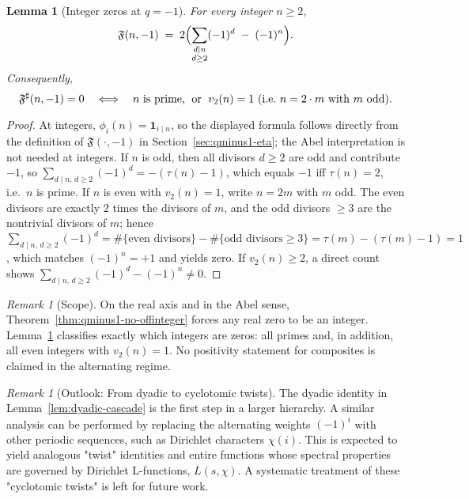 \documentclass[11pt,a4paper]{amsart}
\newcommand{\Fbase}{\mathfrak F}
\newcommand{\Fsharp}{\Fbase^{\sharp}}
\theoremstyle{plain}
\newtheorem{lemma}[theorem]{Lemma}
\theoremstyle{definition}
\theoremstyle{remark}
\newtheorem{remark}[theorem]{Remark}
\begin{document}
\begin{lemma}[Integer zeros at $q=-1$]
\label{lem:qminus1-integer-zeros}
For every integer $n\ge2$,
\[
\mathfrak F(n,-1)\;=\;2\Bigl(\sum_{\substack{d\mid n\\ d\ge2}}(-1)^d\;-\;(-1)^n\Bigr).
\]
Consequently,
\[
\Fsharp(n,-1)=0
\quad\Longleftrightarrow\quad
\text{$n$ is prime, \;or\; $v_2(n)=1$ (i.e.\ $n=2\cdot m$ with $m$ odd).}
\]
\end{lemma}

\begin{proof}
At integers, $\phi_i(n)=\mathbf 1_{i\mid n}$, so the displayed formula follows directly from the definition of
$\mathfrak F(\cdot,-1)$ in Section~\ref{sec:qminus1-eta}; the Abel interpretation is not needed at integers.
If $n$ is odd, then all divisors $d\ge2$ are odd and contribute $-1$, so
$\sum_{d\mid n,\,d\ge2}(-1)^d=-(\tau(n)-1)$, which equals $-1$ iff $\tau(n)=2$, i.e.\ $n$ is prime.
If $n$ is even with $v_2(n)=1$, write $n=2m$ with $m$ odd. The even divisors are exactly $2$ times the divisors of $m$,
and the odd divisors $\ge3$ are the nontrivial divisors of $m$; hence
$\sum_{d\mid n,\,d\ge2}(-1)^d=\#\{\text{even divisors}\}-\#\{\text{odd divisors}\ge3\}=\tau(m)-(\tau(m)-1)=1$,
which matches $(-1)^n=+1$ and yields zero. If $v_2(n)\ge2$, a direct count shows
$\sum_{d\mid n,\,d\ge2}(-1)^d-(-1)^n\neq0$.
\end{proof}

\begin{remark}[Scope]
On the real axis and in the Abel sense, Theorem~\ref{thm:qminus1-no-offinteger} forces any real zero to be an integer.
Lemma~\ref{lem:qminus1-integer-zeros} classifies exactly which integers are zeros: all primes and, in addition, all even integers with $v_2(n)=1$.
No positivity statement for composites is claimed in the alternating regime.
\end{remark}

\begin{remark}[Outlook: From dyadic to cyclotomic twists]
The dyadic identity in Lemma~\ref{lem:dyadic-cascade} is the first step in a larger hierarchy. A similar analysis can be performed by replacing the alternating weights $(-1)^i$ with other periodic sequences, such as Dirichlet characters $\chi(i)$. This is expected to yield analogous "twist" identities and entire functions whose spectral properties are governed by Dirichlet L-functions, $L(s,\chi)$. A systematic treatment of these "cyclotomic twists" is left for future work.
\end{remark}
\end{document}
